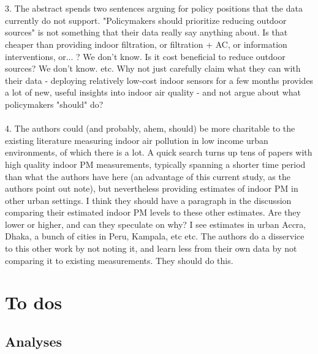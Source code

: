 \documentclass[12pt,english]{article}
\begin{document}
\\
\\
3. The abstract spends two sentences arguing for policy positions that the data currently do not support. "Policymakers should prioritize reducing outdoor sources" is not something that their data really say anything about. Is that cheaper than providing indoor filtration, or filtration + AC, or information interventions, or... ? We don't know. Is it cost beneficial to reduce outdoor sources? We don't know. etc. Why not just carefully claim what they can with their data - deploying relatively low-cost indoor sensors for a few months provides a lot of new, useful insights into indoor air quality - and not argue about what policymakers "should" do?
\\
\\
4. The authors could (and probably, ahem, should) be more charitable to the existing literature measuring indoor air pollution in low income urban environments, of which there is a lot. A quick search turns up tens of papers with high quality indoor PM measurements, typically spanning a shorter time period than what the authors have here (an advantage of this current study, as the authors point out note), but nevertheless providing estimates of indoor PM in other urban settings. I think they should have a paragraph in the discussion comparing their estimated indoor PM levels to these other estimates. Are they lower or higher, and can they speculate on why? I see estimates in urban Accra, Dhaka, a bunch of cities in Peru, Kampala, etc etc. The authors do a disservice to this other work by not noting it, and learn less from their own data by not comparing it to existing measurements. They should do this.


\section{To dos}
\subsection{Analyses}
\end{document}
